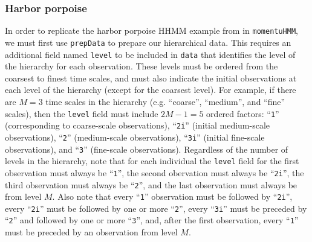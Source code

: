 \documentclass[12pt]{article}\usepackage[]{graphicx}\usepackage[]{color}
\begin{document}
\subsubsection{Harbor porpoise}
\label{sec:harborPorpoise}
In order to replicate the harbor porpoise HHMM example from \cite{Leos-BarajasEtAl2017} in \verb|momentuHMM|, we must first use \verb|prepData| to prepare our hierarchical data. This requires an additional field named \verb|level| to be included in \verb|data| that identifies the level of the hierarchy for each observation. These levels must be ordered from the coarsest to finest time scales, and must also indicate the initial observations at each level of the hierarchy (except for the coarsest level).  For example, if there are $M=3$ time scales in the hierarchy (e.g. ``coarse'', ``medium'', and ``fine'' scales), then the \verb|level| field must include $2M-1=5$ ordered factors: ``\verb|1|'' (corresponding to coarse-scale observations), ``\verb|2i|'' (initial medium-scale observations), ``\verb|2|'' (medium-scale observations), ``\verb|3i|'' (initial fine-scale observations), and ``\verb|3|'' (fine-scale observations). Regardless of the number of levels in the hierarchy, note that for each individual the \verb|level| field for the first observation must always be ``\verb|1|'', the second obervation must always be ``\verb|2i|'', the third observation must always be ``\verb|2|'', and the last observation must always be from level $M$. Also note that every ``\verb|1|'' observation must be followed by ``\verb|2i|'', every ``\verb|2i|'' must be followed by one or more ``\verb|2|'', every ``\verb|3i|'' must be preceded by ``\verb|2|'' and followed by one or more ``\verb|3|'', and, after the first observation, every ``\verb|1|'' must be preceded by an observation from level $M$.
\end{document}
